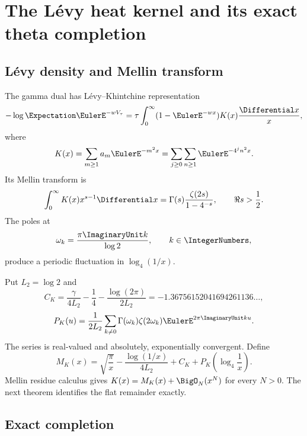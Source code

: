 \documentclass[11pt]{article}
\numberwithin{equation}{section}
\theoremstyle{definition}
\theoremstyle{remark}
\begin{document}
\section{The L\'evy heat kernel and its exact theta completion}

\subsection{L\'evy density and Mellin transform}

The gamma dual has L\'evy--Khintchine representation
\begin{equation}\label{p5:eq:Levy-Khintchine}
 -\log\Expectation\EulerE^{-wV_\tau}
 =\tau\int_0^\infty(1-\EulerE^{-wx})K(x)\frac{\Differential x}{x},
\end{equation}
where
\begin{equation}\label{p5:eq:K-def}
 K(x)=\sum_{m\ge1}a_m\EulerE^{-m^2x}
 =\sum_{j\ge0}\sum_{n\ge1}\EulerE^{-4^jn^2x}.
\end{equation}
Its Mellin transform is
\begin{equation}\label{p5:eq:K-Mellin}
 \int_0^\infty K(x)x^{s-1}\Differential x
 =\Gamma(s)\frac{\zeta(2s)}{1-4^{-s}},
 \qquad \Re s>\frac12.
\end{equation}
The poles at
\begin{equation}\label{p5:eq:omega-k}
 \omega_k=\frac{\pi\ImaginaryUnit k}{\log2},\qquad k\in\IntegerNumbers,
\end{equation}
produce a periodic fluctuation in $\log_4(1/x)$.

Put $L_2=\log2$ and
\begin{equation}\label{p5:eq:CK}
 C_K=\frac{\gamma}{4L_2}-\frac14-
 \frac{\log(2\pi)}{2L_2}
 =-1.36756152041694261136\ldots,
\end{equation}
\begin{equation}\label{p5:eq:PK}
 P_K(u)=\frac1{2L_2}\sum_{k\ne0}
 \Gamma(\omega_k)\zeta(2\omega_k)\EulerE^{2\pi\ImaginaryUnit ku}.
\end{equation}
The series is real-valued and absolutely, exponentially convergent.
Define
\begin{equation}\label{p5:eq:MK}
 M_K(x)=\sqrt{\frac\pi x}
 -\frac{\log(1/x)}{4L_2}+C_K
 +P_K\!\left(\log_4\frac1x\right).
\end{equation}
Mellin residue calculus gives $K(x)=M_K(x)+\BigO_N(x^N)$ for every $N>0$.
The next theorem identifies the flat remainder exactly.

\subsection{Exact completion}
\end{document}
